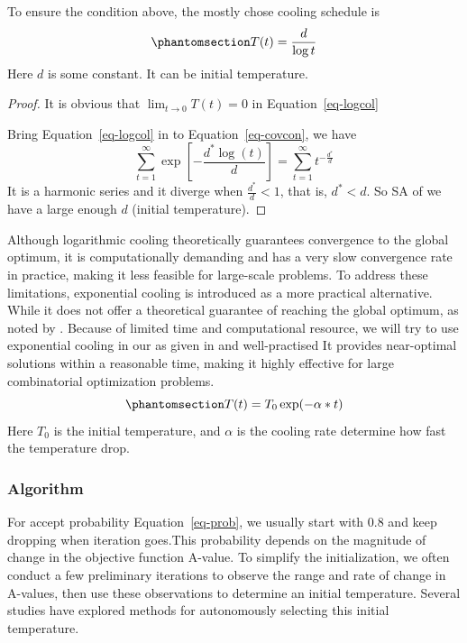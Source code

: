 \documentclass[
  a4paper,
  oneside,
  openany,
  12pt,
  onecolumn]{book}
\theoremstyle{plain}
\theoremstyle{definition}
\theoremstyle{remark}
\begin{document}
To ensure the condition above, the mostly chose cooling schedule is
\begin{equation}\phantomsection\label{eq-logcol}{
T(t) = \frac{d}{\log t}
}\end{equation} Here \(d\) is some constant. It can be initial
temperature.

\begin{proof}
It is obvious that \(\lim_{t\to 0} T(t)=0\) in Equation~\ref{eq-logcol}

Bring Equation~\ref{eq-logcol} in to Equation~\ref{eq-covcon}, we have
\[
\sum_{t=1}^{\infty} \exp[-\frac{d^*\log (t)}{d}]=\sum_{t=1}^{\infty}t^{-\frac{d^*}{d}}
\] It is a harmonic series and it diverge when \(\frac{d^*}{d}<1\), that
is, \(d^*<d\). So SA of we have a large enough \(d\) (initial
temperature).
\end{proof}

Although logarithmic cooling theoretically guarantees convergence to the
global optimum, it is computationally demanding and has a very slow
convergence rate in practice, making it less feasible for large-scale
problems. To address these limitations, exponential cooling is
introduced as a more practical alternative. While it does not offer a
theoretical guarantee of reaching the global optimum, as noted by
\citet{kirkpatrick1983optimization}. Because of limited time and
computational resource, we will try to use exponential cooling in our as
given in \citet{aarts1989simulated} and well-practised It provides
near-optimal solutions within a reasonable time, making it highly
effective for large combinatorial optimization problems.
\begin{equation}\phantomsection\label{eq-expcol}{
T(t) = T_0 \exp(-\alpha*t)
}\end{equation} Here \(T_0\) is the initial temperature, and \(\alpha\)
is the cooling rate determine how fast the temperature drop.

\subsubsection{Algorithm}\label{algorithm}

For accept probability Equation~\ref{eq-prob}, we usually start with
\(0.8\) and keep dropping when iteration goes.This probability depends
on the magnitude of change in the objective function A-value. To
simplify the initialization, we often conduct a few preliminary
iterations to observe the range and rate of change in A-values, then use
these observations to determine an initial temperature. Several studies
have explored methods for autonomously selecting this initial
temperature.
\end{document}
